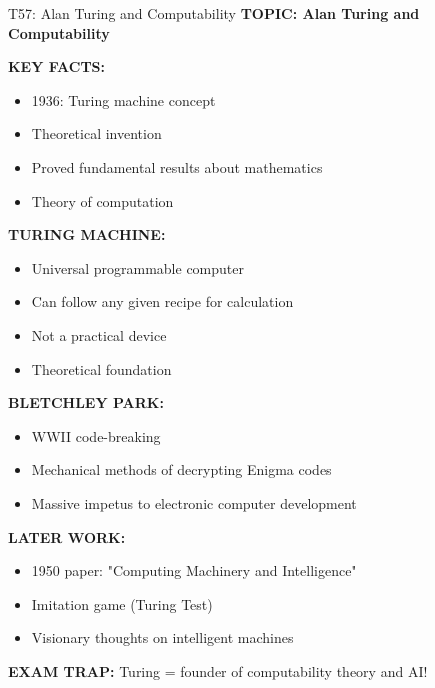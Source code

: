 \documentclass[8pt]{beamer}
\begin{document}
	\begin{frame}{T57: Alan Turing and Computability}
		\fontsize{6.5}{7.5}\selectfont
		\textbf{TOPIC: Alan Turing and Computability}
		
		\vspace{0.1cm}
		\textbf{KEY FACTS:}
		\begin{itemize}
			\item 1936: Turing machine concept
			\item Theoretical invention
			\item Proved fundamental results about mathematics
			\item Theory of computation
		\end{itemize}
		
		\vspace{0.1cm}
		\textbf{TURING MACHINE:}
		\begin{itemize}
			\item Universal programmable computer
			\item Can follow any given recipe for calculation
			\item Not a practical device
			\item Theoretical foundation
		\end{itemize}
		
		\vspace{0.1cm}
		\textbf{BLETCHLEY PARK:}
		\begin{itemize}
			\item WWII code-breaking
			\item Mechanical methods of decrypting Enigma codes
			\item Massive impetus to electronic computer development
		\end{itemize}
		
		\vspace{0.1cm}
		\textbf{LATER WORK:}
		\begin{itemize}
			\item 1950 paper: "Computing Machinery and Intelligence"
			\item Imitation game (Turing Test)
			\item Visionary thoughts on intelligent machines
		\end{itemize}
		
		\textcolor{myred}{\textbf{EXAM TRAP:}} Turing = \textcolor{myblue}{founder of computability theory and AI}!
	\end{frame}
	
\end{document}
